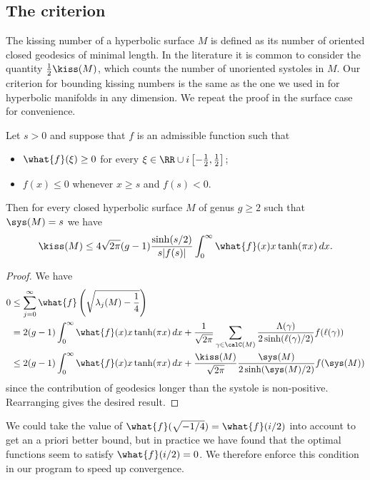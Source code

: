\documentclass[12pt]{amsart}
\numberwithin{equation}{section}
\begin{document}
\subsection{The criterion} \label{subsec:kissing_criterion}
The kissing number of a hyperbolic surface $M$ is defined as its number of oriented closed geodesics of minimal length. In the literature it is common to consider the quantity $\frac12\kiss(M)$, which counts the number of unoriented systoles in $M$. Our criterion for bounding kissing numbers is the same as the one we used in \cite{KissingManifolds} for hyperbolic manifolds in any dimension. We repeat the proof in the surface case for convenience.

\begin{thm} \label{thm:kissing}
Let $s>0$ and suppose that $f$ is an admissible function such that
\begin{itemize}
\item $\what{f}(\xi) \geq 0$ for every $\xi \in \RR \cup i\left[-\frac12,\frac12\right]$;
\item $f(x) \leq 0 $ whenever $x \geq s$ and $f(s) < 0$.
\end{itemize}
Then for every closed hyperbolic surface $M$ of genus $g\geq 2$ such that $\sys(M)=s$ we have
\[
\kiss(M) \leq 4\sqrt{2\pi}(g-1)\frac{\sinh(s/2)}{s| f(s)|} \int_0^\infty \what{f}(x) x\tanh(\pi x) \,dx.
\]
\end{thm}
\begin{proof}
We have
\begin{align*}
0 & \leq \sum_{j=0}^\infty \what{f}\left(\sqrt{\lambda_j(M) - \frac14}\right) \\
& = 2(g-1)\int_0^\infty \what{f}(x) x\tanh(\pi x) \,dx + \frac{1}{\sqrt{2\pi}}\sum_{\gamma \in \calC(M)} \frac{\Lambda(\gamma)}{2 \sinh(\ell(\gamma)/2)} f(\ell(\gamma)) \\
&\leq 2(g-1)\int_0^\infty \what{f}(x) x\tanh(\pi x) \,dx +  \frac{\kiss(M)}{\sqrt{2\pi}} \frac{\sys(M)}{2\sinh(\sys(M)/2)} f(\sys(M))\\
\end{align*}
since the contribution of geodesics longer than the systole is non-positive. Rearranging gives the desired result.
\end{proof}

\begin{rem}
We could take the value of $\what{f}(\sqrt{-1/4})=\what{f}(i/2)$ into account to get an a priori better bound, but in practice we have found that the optimal functions seem to satisfy $\what{f}(i/2)=0$. We therefore enforce this condition in our program to speed up convergence.
\end{rem}
\end{document}
